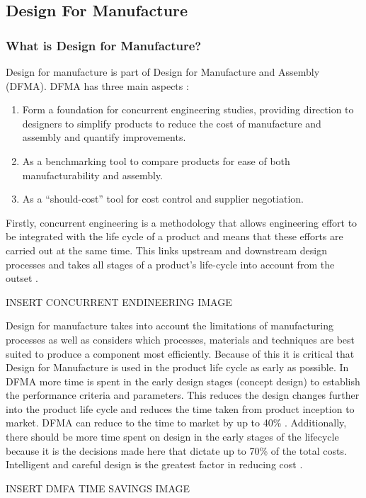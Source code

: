 \subsection{Design For Manufacture}
\subsubsection{What is Design for Manufacture?}
Design for manufacture is part of Design for Manufacture and Assembly (DFMA). DFMA has three main aspects \cite{Boothroyd10}:

\begin{enumerate}
\item Form a foundation for concurrent engineering studies, providing direction to designers to simplify products to reduce the cost of manufacture and assembly and quantify improvements.
\item As a benchmarking tool to compare products for ease of both manufacturability and assembly.
\item As a “should-cost” tool for cost control and supplier negotiation.
\end{enumerate}
Firstly, concurrent engineering is a methodology that allows engineering effort to be integrated with the life cycle of a product and means that these efforts are carried out at the same time. This links upstream and downstream design processes and takes all stages of a product’s life-cycle into account from the outset \cite{Kusiak93}.

INSERT CONCURRENT ENDINEERING IMAGE


Design for manufacture takes into account the limitations of manufacturing processes as well as considers which processes, materials and techniques are best suited to produce a component most efficiently. Because of this it is critical that Design for Manufacture is used in the product life cycle as early as possible. In DFMA more time is spent in the early design stages (concept design) to establish the performance criteria and parameters. This reduces the design changes further into the product life cycle and reduces the time taken from product inception to market. DFMA can reduce to the time to market by up to 40\% \cite{Boothrody10}. Additionally, there should be more time spent on design in the early stages of the lifecycle because it is the decisions made here that dictate up to 70\% of the total costs. Intelligent and careful design is the greatest factor in reducing cost \cite{Boothroyd10}.

INSERT DMFA TIME SAVINGS IMAGE


